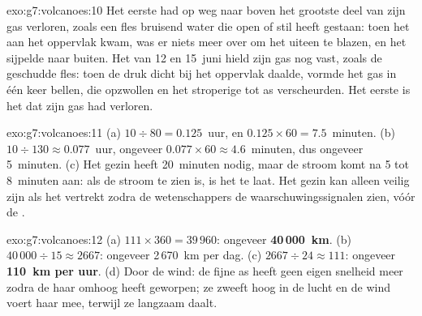 \begin{solution}{exo:g7:volcanoes:10}
Het eerste  had op weg naar boven het grootste deel van zijn gas
verloren, zoals een fles bruisend water die open of stil heeft gestaan:
toen het aan het oppervlak kwam, was er niets meer over om het uiteen te
blazen, en het sijpelde naar buiten. Het  van 12 en 15~juni hield
zijn gas nog vast, zoals de geschudde fles: toen de druk dicht bij het
oppervlak daalde, vormde het gas in één keer bellen, die opzwollen en het
stroperige  tot as verscheurden. Het eerste  is het  dat
zijn gas had verloren.
\end{solution}

\begin{solution}{exo:g7:volcanoes:11}
(a) $10 \div 80 = 0.125$~uur, en $0.125 \times 60 = 7.5$~minuten. (b)
$10 \div 130 \approx 0.077$~uur, ongeveer $0.077 \times 60 \approx
4.6$~minuten, dus ongeveer 5~minuten. (c) Het gezin heeft 20~minuten nodig,
maar de stroom komt na 5 tot 8~minuten aan: als de stroom te zien is, is
het te laat. Het gezin kan alleen veilig zijn als het vertrekt zodra de
wetenschappers de waarschuwingssignalen zien, vóór de .
\end{solution}

\begin{solution}{exo:g7:volcanoes:12}
(a) $111 \times 360 = 39\,960$: ongeveer \textbf{40\,000~km}. (b)
$40\,000 \div 15 \approx 2667$: ongeveer 2\,670~km per dag. (c)
$2667 \div 24 \approx 111$: ongeveer \textbf{110~km per uur}. (d) Door de
wind: de fijne as heeft geen eigen snelheid meer zodra de  haar
omhoog heeft geworpen; ze zweeft hoog in de lucht en de wind voert haar
mee, terwijl ze langzaam daalt.
\end{solution}

